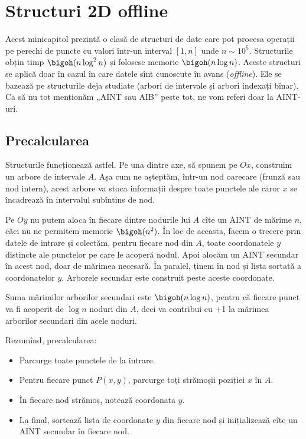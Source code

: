 \chapter{Structuri 2D offline}

Acest minicapitol prezintă o clasă de structuri de date care pot procesa operații pe perechi de puncte cu valori într-un interval $[1, n]$ unde $n \sim 10^5$. Structurile obțin timp $\bigoh(n \log^2 n)$ și folosesc memorie $\bigoh(n \log n)$. Aceste structuri se aplică doar în cazul în care datele sînt cunoscute în avans (\textit{offline}). Ele se bazează pe structurile deja studiate (arbori de intervale și arbori indexați binar). Ca să nu tot menționăm „AINT sau AIB” peste tot, ne vom referi doar la AINT-uri.

\section{Precalcularea}

Structurile funcționează astfel. Pe una dintre axe, să spunem pe $Ox$, construim un arbore de intervale $A$. Așa cum ne așteptăm, într-un nod oarecare (frunză sau nod intern), acest arbore va stoca informații despre toate punctele ale căror $x$ se încadrează în intervalul subîntins de nod.

Pe $Oy$ nu putem aloca în fiecare dintre nodurile lui $A$ cîte un AINT de mărime $n$, căci nu ne permitem memorie $\bigoh(n^2)$. În loc de aceasta, facem o trecere prin datele de intrare și colectăm, pentru fiecare nod din $A$, toate coordonatele $y$ distincte ale punctelor pe care le acoperă nodul. Apoi alocăm un AINT secundar în acest nod, doar de mărimea necesară. În paralel, ținem în nod și lista sortată a coordonatelor $y$. Arborele secundar este construit peste aceste coordonate.

Suma mărimilor arborilor secundari este $\bigoh(n \log n)$, pentru că fiecare punct va fi acoperit de $\log n$ noduri din $A$, deci va contribui cu +1 la mărimea arborilor secundari din acele noduri.

Rezumînd, precalcularea:

\begin{itemize}
  \item Parcurge toate punctele de la intrare.
  \item Pentru fiecare punct $P(x, y)$, parcurge toți strămoșii poziției $x$ în $A$.
  \item În fiecare nod strămoș, notează coordonata $y$.
  \item La final, sortează lista de coordonate $y$ din fiecare nod și inițializează cîte un AINT secundar în fiecare nod.
\end{itemize}

